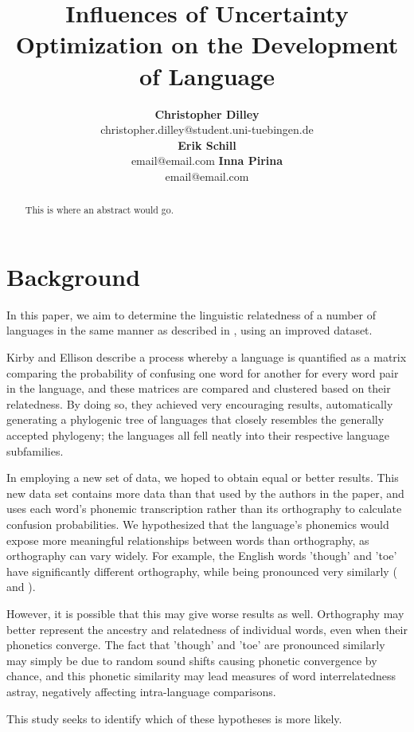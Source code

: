 \documentclass[10pt,a4]{article}
\title{Influences of Uncertainty Optimization on the Development of Language}
\author{{\large \bf Christopher Dilley} \\
	 christopher.dilley@student.uni-tuebingen.de \\\And
	{\large \bf Erik Schill} \\
	email@email.com \And
	{\large \bf Inna Pirina} \\
	email@email.com }
\begin{document}
\maketitle


\begin{abstract}
	
	This is where an abstract would go.
	
\end{abstract}


\section{Background}

In this paper, we aim to determine the linguistic relatedness of a number of languages in the same manner as described in , using an improved dataset.  

Kirby and Ellison describe a process whereby a language is quantified as a matrix comparing the probability of confusing one word for another for every word pair in the language, and these matrices are compared and clustered based on their relatedness.  By doing so, they achieved very encouraging results, automatically generating a phylogenic tree of languages that closely resembles the generally accepted phylogeny; the languages all fell neatly into their respective language subfamilies.

In employing a new set of data, we hoped to obtain equal or better results.  This new data set contains more data than that used by the authors in the paper, and uses each word's phonemic transcription rather than its orthography to calculate confusion probabilities.  We hypothesized that the language's phonemics would expose more meaningful relationships between words than orthography, as orthography can vary widely.  For example, the English words 'though' and 'toe' have significantly different orthography, while being pronounced very similarly (\textipa{[Do:]} and \textipa{[to:]}).

However, it is possible that this may give worse results as well.  Orthography may better represent the ancestry and relatedness of individual words, even when their phonetics converge.  The fact that 'though' and 'toe' are pronounced similarly may simply be due to random sound shifts causing phonetic convergence by chance, and this phonetic similarity may lead measures of word interrelatedness astray, negatively affecting intra-language comparisons. 

This study seeks to identify which of these hypotheses is more likely. \\
\end{document}
